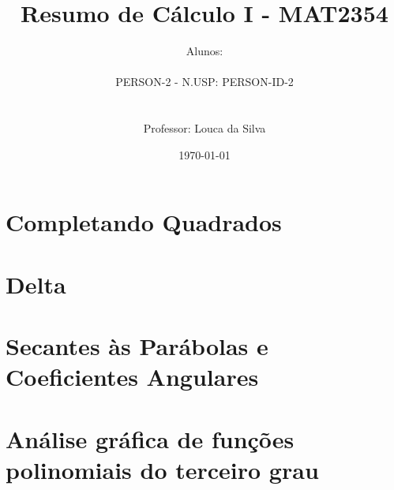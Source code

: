 \documentclass[12pt, a4paper]{article}
\title{
	Resumo de Cálculo I - MAT2354
}
\author{
	Alunos:
	\\  
	\\ {{PERSON-2}} - N.USP: {{PERSON-ID-2}}
	\\ \\
	\\ Professor: Louca da Silva
}
\date{\today}
\begin{document}
	\maketitle
	\thispagestyle{empty}
	\newpage

	\section{Completando Quadrados}

	

	\section{Delta}

	

	\section{Secantes às Parábolas e Coeficientes Angulares}

	

	\section{Análise gráfica de funções polinomiais do terceiro grau}

	
\end{document}
